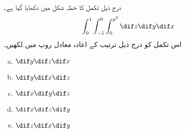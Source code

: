 درج ذیل تکمل  کا خطہ شکل  میں  دکھایا گیا ہے۔
\begin{align*}
\int_0^1\int_{-1}^0\int_0^{y^2}\dif z\dif y\dif x
\end{align*}
اس تکمل کو درج ذیل  ترتیب کے اعادہ  معادل روپ میں لکھیں۔
\begin{multicols}{3}
\begin{enumerate}[a.]
\item
$\dif y\dif z\dif x$
\item
$\dif y\dif x\dif z$
\item
$\dif x\dif y\dif z$
\item
$\dif x\dif z\dif y$
\item
$\dif z\dif x\dif y$
\end{enumerate}
\end{multicols}

